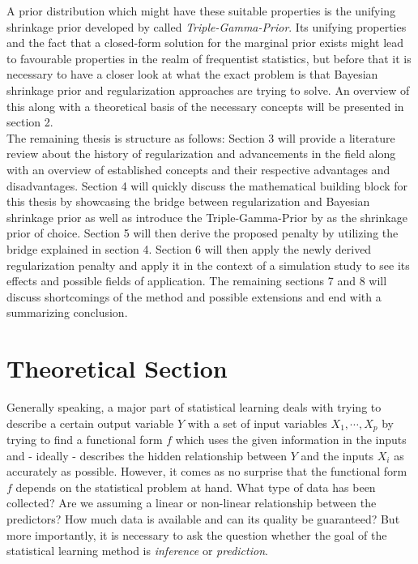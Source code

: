 \documentclass[12pt,a4paper]{article}
\begin{document}
A prior distribution which might have these suitable properties is the unifying shrinkage prior developed by \textcite{TGP2020} called \textit{Triple-Gamma-Prior}. Its unifying properties and the fact that a closed-form solution for the marginal prior exists might lead to favourable properties in the realm of frequentist statistics, but before that it is necessary to have a closer look at what the exact problem is that Bayesian shrinkage prior and regularization approaches are trying to solve. An overview of this along with a theoretical basis of the necessary concepts will be presented in section 2.\\

The remaining thesis is structure as follows: Section 3 will provide a literature review about the history of regularization and advancements in the field along with an overview of established concepts and their respective advantages and disadvantages. Section 4 will quickly discuss the mathematical building block for this thesis by showcasing the bridge between regularization and Bayesian shrinkage prior as well as introduce the Triple-Gamma-Prior by \textcite{TGP2020} as the shrinkage prior of choice. Section 5 will then derive the proposed penalty by utilizing the bridge explained in section 4. Section 6 will then apply the newly derived regularization penalty and apply it in the context of a simulation study to see its effects and possible fields of application. The remaining sections 7 and 8 will discuss shortcomings of the method and possible extensions and end with a summarizing conclusion. 

\newpage
\section{Theoretical Section}\label{sec:theorysuper}
Generally speaking, a major part of statistical learning deals with trying to describe a certain output variable $Y$ with a set of input variables $X_1, \cdots, X_p$ by trying to find a functional form $f$ which uses the given information in the inputs and - ideally - describes the hidden relationship between $Y$ and the inputs $X_i$ as accurately as possible. However, it comes as no surprise that the functional form $f$ depends on the statistical problem at hand. What type of data has been collected? Are we assuming a linear or non-linear relationship between the predictors? How much data is available and can its quality be guaranteed? But more importantly, it is necessary to ask the question whether the goal of the statistical learning method is \textit{inference} or \textit{prediction}.\\
\end{document}
